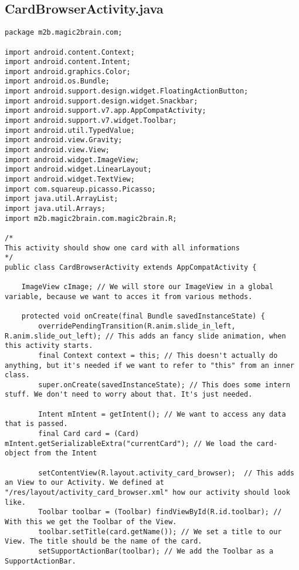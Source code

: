 \subsection{CardBrowserActivity.java}
\begin{lstlisting}
package m2b.magic2brain.com;

import android.content.Context;
import android.content.Intent;
import android.graphics.Color;
import android.os.Bundle;
import android.support.design.widget.FloatingActionButton;
import android.support.design.widget.Snackbar;
import android.support.v7.app.AppCompatActivity;
import android.support.v7.widget.Toolbar;
import android.util.TypedValue;
import android.view.Gravity;
import android.view.View;
import android.widget.ImageView;
import android.widget.LinearLayout;
import android.widget.TextView;
import com.squareup.picasso.Picasso;
import java.util.ArrayList;
import java.util.Arrays;
import m2b.magic2brain.com.magic2brain.R;

/*
This activity should show one card with all informations
*/
public class CardBrowserActivity extends AppCompatActivity {

    ImageView cImage; // We will store our ImageView in a global variable, because we want to acces it from various methods.

    protected void onCreate(final Bundle savedInstanceState) {
        overridePendingTransition(R.anim.slide_in_left, R.anim.slide_out_left); // This adds an fancy slide animation, when this activity starts.
        final Context context = this; // This doesn't actually do anything, but it's needed if we want to refer to "this" from an inner class.
        super.onCreate(savedInstanceState); // This does some intern stuff. We don't need to worry about that. It's just needed.

        Intent mIntent = getIntent(); // We want to access any data that is passed.
        final Card card = (Card) mIntent.getSerializableExtra("currentCard"); // We load the card-object from the Intent

        setContentView(R.layout.activity_card_browser);  // This adds an View to our Activity. We defined at "/res/layout/activity_card_browser.xml" how our activity should look like.
        Toolbar toolbar = (Toolbar) findViewById(R.id.toolbar); // With this we get the Toolbar of the View.
        toolbar.setTitle(card.getName()); // We set a title to our View. The title should be the name of the card.
        setSupportActionBar(toolbar); // We add the Toolbar as a SupportActionBar.


\end{lstlisting}
